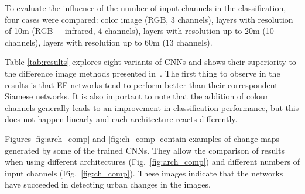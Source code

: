 \documentclass{article}
\begin{document}
To evaluate the influence of the number of input channels in the classification, four cases were compared: color image (RGB, 3 channels), layers with resolution of 10m (RGB + infrared, 4 channels), layers with resolution up to 20m (10 channels), layers with resolution up to 60m (13 channels).


Table \ref{tab:results} explores eight variants of CNNs and shows their superiority to the difference image methods presented in~\cite{le2013urban}.
The first thing to observe in the results is that EF networks tend to perform better than their correspondent Siamese networks. It is also important to note that the addition of colour channels generally leads to an improvement in classification performance, but this does not happen linearly and each architecture reacts differently.


Figures \ref{fig:arch_comp} and \ref{fig:ch_comp} contain examples of change maps generated by some of the trained CNNs. They allow the comparison of results when using different architectures (Fig.~\ref{fig:arch_comp}) and different numbers of input channels (Fig.~\ref{fig:ch_comp}). These images indicate that the networks have succeeded in detecting urban changes in the images.

\end{document}
